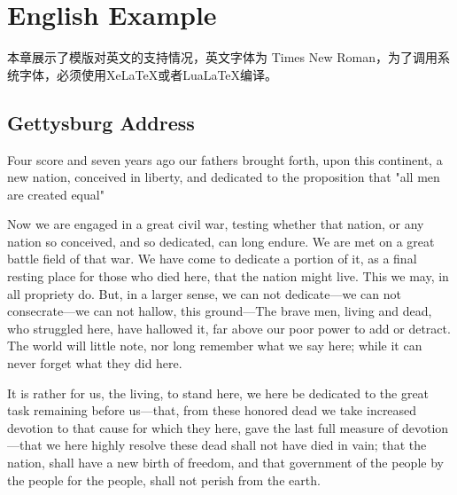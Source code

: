 \chapter{English Example}

本章展示了模版对英文的支持情况，英文字体为 Times New Roman，为了调用系统字体，必须使用XeLaTeX或者LuaLaTeX编译。

\section{Gettysburg Address}

Four score and seven years ago our fathers brought forth, upon this continent, a new nation, conceived in liberty, and dedicated to the proposition that "all men are created equal"

Now we are engaged in a great civil war, testing whether that nation, or any nation so conceived, and so dedicated, can long endure. We are met on a great battle field of that war. We have come to dedicate a portion of it, as a final resting place for those who died here, that the nation might live. This we may, in all propriety do. But, in a larger sense, we can not dedicate—we can not consecrate—we can not hallow, this ground—The brave men, living and dead, who struggled here, have hallowed it, far above our poor power to add or detract. The world will little note, nor long remember what we say here; while it can never forget what they did here.

It is rather for us, the living, to stand here, we here be dedicated to the great task remaining before us—that, from these honored dead we take increased devotion to that cause for which they here, gave the last full measure of devotion—that we here highly resolve these dead shall not have died in vain; that the nation, shall have a new birth of freedom, and that government of the people by the people for the people, shall not perish from the earth.
